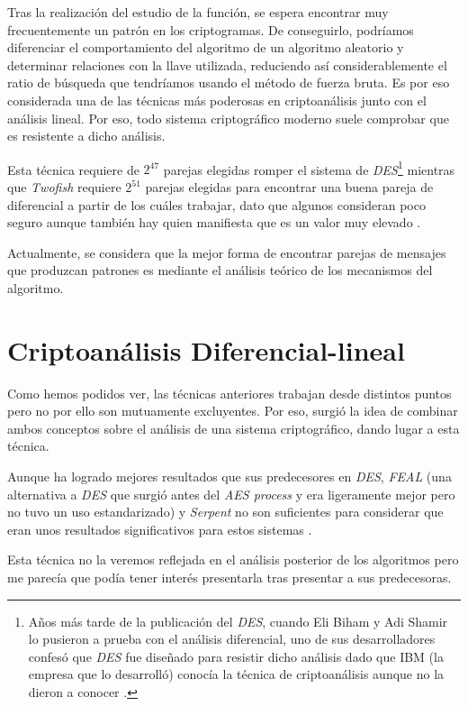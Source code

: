 Tras la realización del estudio de la función, se espera encontrar muy frecuentemente un patrón en los criptogramas. De conseguirlo, podríamos diferenciar el comportamiento del algoritmo de un algoritmo aleatorio y determinar relaciones con la llave utilizada, reduciendo así considerablemente el ratio de búsqueda que tendríamos usando el método de fuerza bruta. Es por eso considerada una de las técnicas más poderosas en criptoanálisis junto con el análisis lineal. Por eso, todo sistema criptográfico moderno suele comprobar que es resistente a dicho análisis.


Esta técnica requiere de $2^{47}$ parejas elegidas romper el sistema de \textit{DES}\footnote{Años más tarde de la publicación del \textit{DES}, cuando Eli Biham y Adi Shamir lo pusieron a prueba con el análisis diferencial, uno de sus desarrolladores confesó que \textit{DES} fue diseñado para resistir dicho análisis dado que IBM (la empresa que lo desarrolló) conocía la técnica de criptoanálisis aunque no la dieron a conocer \cite{DES_Diff2}.} \cite{DES_Diff} mientras que \textit{Twofish} requiere $2^{51}$ parejas elegidas para encontrar una buena pareja de diferencial a partir de los cuáles trabajar, dato que algunos consideran poco seguro aunque también hay quien manifiesta que es un valor muy elevado \cite{Twofish_attack}.

Actualmente, se considera que la mejor forma de encontrar parejas de mensajes que produzcan patrones es mediante el análisis teórico de los mecanismos del algoritmo.

\section{Criptoanálisis Diferencial-lineal}
Como hemos podidos ver, las técnicas anteriores trabajan desde distintos puntos pero no por ello son mutuamente excluyentes. Por eso, surgió la idea de combinar ambos conceptos sobre el análisis de una sistema criptográfico, dando lugar a esta técnica.

Aunque ha logrado mejores resultados que sus predecesores en \textit{DES}, \textit{FEAL} (una alternativa a \textit{DES} que surgió antes del \textit{AES process} y era ligeramente mejor pero no tuvo un uso estandarizado) y \textit{Serpent} no son suficientes para considerar que eran unos resultados significativos para estos sistemas \cite{Diff-Lin_Def}.

Esta técnica no la veremos reflejada en el análisis posterior de los algoritmos pero me parecía que podía tener interés presentarla tras presentar a sus predecesoras.
